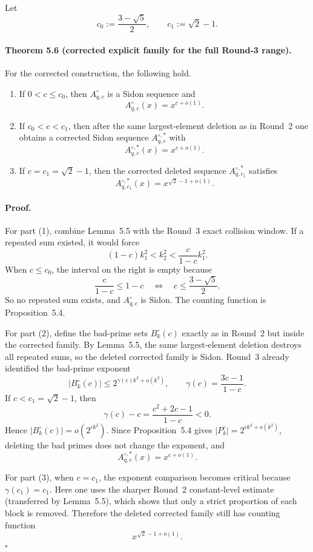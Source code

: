 Let
\[
c_0:=\frac{3-\sqrt5}{2},
\qquad
c_1:=\sqrt2-1.
\]

\paragraph{Theorem 5.6 (corrected explicit family for the full Round-3 range).}
For the corrected construction, the following hold.
\begin{enumerate}
\item If $0<c\le c_0$, then $A_{q,c}^{\circ}$ is a Sidon sequence and
\[
A_{q,c}^{\circ}(x)=x^{c+o(1)}.
\]
\item If $c_0<c<c_1$, then after the same largest-element deletion as in Round~2 one obtains a corrected Sidon sequence $A_{q,c}^{\circ,*}$ with
\[
A_{q,c}^{\circ,*}(x)=x^{c+o(1)}.
\]
\item If $c=c_1=\sqrt2-1$, then the corrected deleted sequence $A_{q,c_1}^{\circ,*}$ satisfies
\[
A_{q,c_1}^{\circ,*}(x)=x^{\sqrt2-1+o(1)}.
\]
\end{enumerate}

\paragraph{Proof.}
For part (1), combine Lemma~5.5 with the Round~3 exact collision window.
If a repeated sum existed, it would force
\[
(1-c)k_1^2<k_2^2<\frac{c}{1-c}k_1^2.
\]
When $c\le c_0$, the interval on the right is empty because
\[
\frac{c}{1-c}\le 1-c
\quad\Longleftrightarrow\quad
c\le \frac{3-\sqrt5}{2}.
\]
So no repeated sum exists, and $A_{q,c}^{\circ}$ is Sidon.
The counting function is Proposition~5.4.

For part (2), define the bad-prime sets $B_k^{\circ}(c)$ exactly as in Round~2 but inside the corrected family.
By Lemma~5.5, the same largest-element deletion destroys all repeated sums, so the deleted corrected family is Sidon.
Round~3 already identified the bad-prime exponent
\[
|B_k^{\circ}(c)|\le 2^{\gamma(c)k^2+o(k^2)},
\qquad
\gamma(c)=\frac{3c-1}{1-c}.
\]
If $c<c_1=\sqrt2-1$, then
\[
\gamma(c)-c=\frac{c^2+2c-1}{1-c}<0.
\]
Hence $|B_k^{\circ}(c)|=o(2^{ck^2})$.
Since Proposition~5.4 gives $|P_k^{\circ}|=2^{ck^2+o(k^2)}$, deleting the bad primes does not change the exponent, and
\[
A_{q,c}^{\circ,*}(x)=x^{c+o(1)}.
\]

For part (3), when $c=c_1$, the exponent comparison becomes critical because $\gamma(c_1)=c_1$.
Here one uses the sharper Round~2 constant-level estimate (transferred by Lemma~5.5), which shows that only a strict proportion of each block is removed.
Therefore the deleted corrected family still has counting function
\[
x^{\sqrt2-1+o(1)}.
\]
\hfill$\square$

